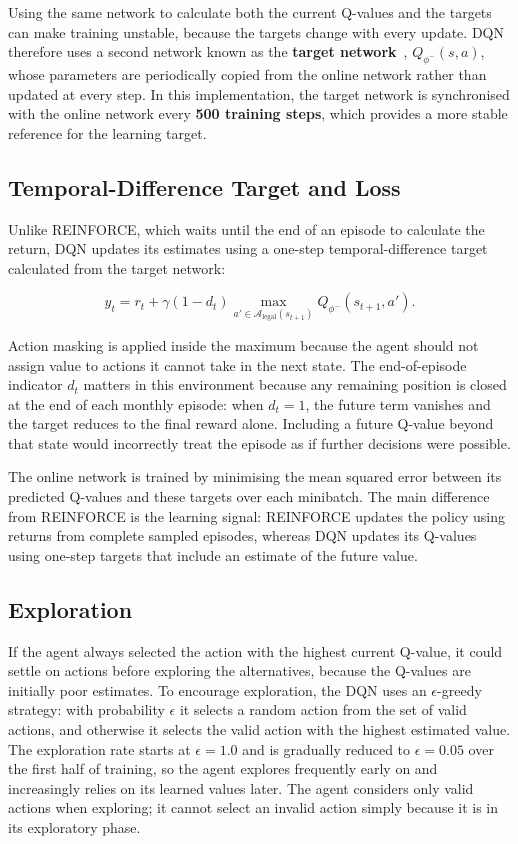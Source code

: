 Using the same network to calculate both the current Q-values and the
targets can make training unstable, because the targets change with
every update. DQN therefore uses a second network known as the
\textbf{target network}~\cite{mnih2015}, \(Q_{\phi^{-}}(s,a)\), whose
parameters are periodically copied from the online network rather than
updated at every step. In this implementation, the target network is
synchronised with the online network every \textbf{500 training steps},
which provides a more stable reference for the learning target.

\subsection{Temporal-Difference Target and Loss}

Unlike REINFORCE, which waits until the end of an episode to calculate
the return, DQN updates its estimates using a one-step
temporal-difference target calculated from the target network:

\[y_{t} = r_{t} + \gamma\left( 1 - d_{t} \right)\max_{a' \in \mathcal{A}_{\text{legal}}\left( s_{t + 1} \right)}{Q_{\phi^{-}}\left( s_{t + 1},a' \right)}.\]

Action masking is applied inside the maximum because the agent should
not assign value to actions it cannot take in the next state. The
end-of-episode indicator \(d_{t}\) matters in this environment because
any remaining position is closed at the end of each monthly episode:
when \(d_{t} = 1\), the future term vanishes and the target reduces to
the final reward alone. Including a future Q-value beyond that state
would incorrectly treat the episode as if further decisions were
possible.

The online network is trained by minimising the mean squared error
between its predicted Q-values and these targets over each minibatch.
The main difference from REINFORCE is the learning signal: REINFORCE
updates the policy using returns from complete sampled episodes, whereas
DQN updates its Q-values using one-step targets that include an estimate
of the future value.

\subsection{Exploration}

If the agent always selected the action with the highest current
Q-value, it could settle on actions before exploring the alternatives,
because the Q-values are initially poor estimates. To encourage
exploration, the DQN uses an \(\epsilon\)-greedy strategy: with
probability \(\epsilon\) it selects a random action from the set of
valid actions, and otherwise it selects the valid action with the
highest estimated value. The exploration rate starts at
\(\epsilon = 1.0\) and is gradually reduced to \(\epsilon = 0.05\) over
the first half of training, so the agent explores frequently early on
and increasingly relies on its learned values later. The agent considers
only valid actions when exploring; it cannot select an invalid action
simply because it is in its exploratory phase.

